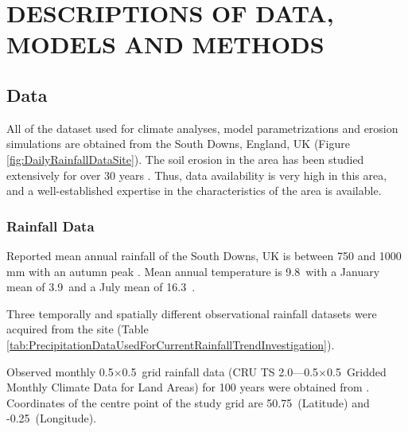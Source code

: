 \chapter{DESCRIPTIONS OF DATA, MODELS AND METHODS}
\label{sec:SIMULATIONDATAMODELSANDMETHODS}

\section{Data}
\label{sec:Data}

All of the dataset used for climate analyses, model parametrizations and erosion
simulations are obtained from the South Downs, England, UK (Figure
\ref{fig:DailyRainfallDataSite}). The soil erosion in the area has been studied
extensively for over 30 years
\citep{boardman1995-177,favis1995-365,favis-mortlock1997-79,
favis-mortlock1998-141,boardman2001-346,boardman2003-176}. Thus, data
availability is very high in this area, and a well-established expertise in the
characteristics of the area is available.

\subsection{Rainfall Data}
\label{sec:RainfallData}

Reported mean annual rainfall of the South Downs, UK is between 750 and 1000 mm
with an autumn peak \citep{potts1983-88}. Mean annual temperature is
9.8\textcelsius\ with a January mean of 3.9\textcelsius\ and a July mean of
16.3\textcelsius\ \citep{potts1983-88}.

Three temporally and spatially different observational rainfall datasets were
acquired from the site (Table
\ref{tab:PrecipitationDataUsedForCurrentRainfallTrendInvestigation}).

Observed monthly 0.5\textdegree$\times$0.5\textdegree\ grid rainfall data (CRU
TS 2.0---0.5\textdegree$\times$0.5\textdegree\ Gridded Monthly Climate Data for
Land Areas) for 100 years were obtained from \citet{mitchell2004-a}. Coordinates
of the centre point of the study grid are 50.75\textdegree\ (Latitude) and
-0.25\textdegree\ (Longitude).

